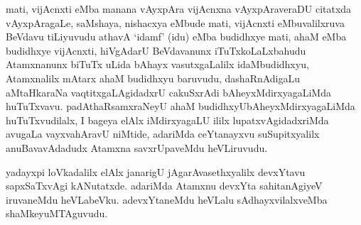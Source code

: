 \begin{artha}
mati, vijAcnxti eMba manana vAyxpAra vijAcnxna vAyxpAraveraDU citatxda vAyxpAragaLe, saMshaya, nishacxya eMbude mati, vijAcnxti eMbuvalilxruva BeVdavu tiLiyuvudu athavA `idamf' (idu) eMba budidhxye mati, ahaM eMba budidhxye vijAcnxti, hiVgAdarU BeVdavanunx iTuTxkoLaLxbahudu Atamxnanunx biTuTx uLida bAhayx vasutxgaLalilx idaMbudidhxyu, Atamxnalilx mAtarx ahaM budidhxyu baruvudu, dashaRnAdigaLu aMtaHkaraNa vaqtitxgaLAgidadxrU cakuSxrAdi bAheyxMdirxyagaLiMda huTuTxvavu. padAthaRsamxraNeyU ahaM budidhxyU\break bAheyxMdirxyagaLiMda huTuTxvudilalx, I bageya elAlx iMdirxyagaLU ililx lupatxvAgidadxriMda avugaLa vayxvahAravU niMtide, adariMda ceYtanayxvu suSupitxyalilx anuBavavAdadudx Atamxna savxrUpaveMdu heVLiruvudu.
\end{artha}%


\begin{artha}
yadayxpi loVkadalilx elAlx janarigU jAgarAvasethxyalilx devxYtavu sapxSaTxvAgi kANutatxde. adariMda Atamxnu devxYta sahitanAgiyeV iruvaneMdu heVLabeVku. adevxYtaneMdu heVLalu sAdhayxvilalxveMba shaMkeyuMTAguvudu.
\end{artha}


